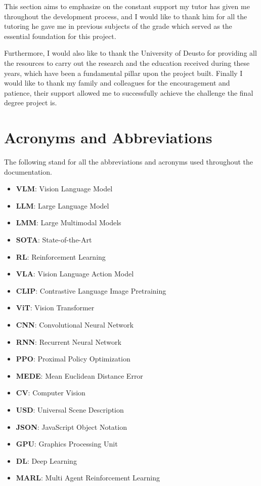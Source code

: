 \documentclass{templateDeusto}
\begin{document}
	This section aims to emphasize on the constant support my tutor has given me throughout the development process, and I would like to thank him for all the tutoring he gave me in previous subjects of the grade which served as the essential foundation for this project. 
	
	Furthermore, I would also like to thank the University of Deusto for providing all the resources to carry out the research and the education received during these years, which have been a fundamental pillar upon the project built. Finally I would like to thank my family and colleagues for the encouragement and patience, their support allowed me to successfully achieve the challenge the final degree project is. 
	
	\chapter*{Acronyms and Abbreviations}
	The following stand for all the abbreviations and acronyms used throughout the documentation.
	
	\begin{itemize}
		\item \textbf{VLM}: Vision Language Model
		\item \textbf{LLM}: Large Language Model
		\item \textbf{LMM}: Large Multimodal Models
		\item \textbf{SOTA}: State-of-the-Art
		\item \textbf{RL}: Reinforcement Learning
		\item \textbf{VLA}: Vision Language Action Model
		\item \textbf{CLIP}: Contrastive Language Image Pretraining
		\item \textbf{ViT}: Vision Transformer
		\item \textbf{CNN}: Convolutional Neural Network
		\item \textbf{RNN}: Recurrent Neural Network
		\item \textbf{PPO}: Proximal Policy Optimization
		\item \textbf{MEDE}: Mean Euclidean Distance Error
		\item \textbf{CV}: Computer Vision
		\item \textbf{USD}: Universal Scene Description
		\item \textbf{JSON}: JavaScript Object Notation
		\item \textbf{GPU}: Graphics Processing Unit
		\item \textbf{DL}: Deep Learning
		\item \textbf{MARL}: Multi Agent Reinforcement Learning
		
	\end{itemize}
	
\end{document}
